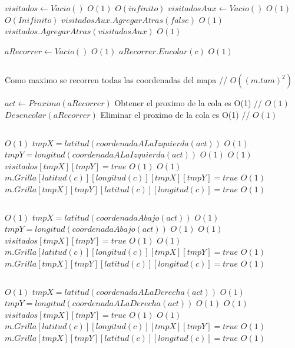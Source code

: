 \begin{Algoritmos}
\begin{algorithmic}[1]
\State $visitados \gets Vacio() $ \Comment $O(1)$
	    \Comment $O(infinito)$
\State $visitadosAux \gets Vacio() $ \Comment $O(1)$	
      \Comment $O(Inifinito)$
\State $visitadosAux.AgregarAtras(false)$ \Comment $O(1)$
\EndFor
\State $visitados.AgregarAtras(visitadosAux)$ \Comment $O(1)$
\EndFor


\State $aRecorrer \gets Vacio() $ \Comment $O(1)$
\State $aRecorrer.Encolar(c)$ \Comment $O(1)$

\State $ $

    \Comment Como maximo se recorren todas las coordenadas del mapa // $O((m.tam)^2)$

\State $act \gets Proximo(aRecorrer)$ \Comment Obtener el proximo de la cola es O(1) // $O(1)$
\State $Desencolar(aRecorrer)$ \Comment Eliminar el proximo de la cola es O(1) // $O(1)$

\State $ $


      \Comment $O(1)$
\State $tmpX = latitud(coordenadaALaIzquierda(act))$   \Comment $O(1)$
\State $tmpY = longitud(coordenadaALaIzquierda(act))$  \Comment $O(1)$
    \Comment $O(1)$
\State $visitados[tmpX][tmpY] = true$    \Comment $O(1)$
	 	\Comment $O(1)$
		\State $m.Grilla[latitud(c)][longitud(c)][tmpX][tmpY] = true$ \Comment $O(1)$
		\State $m.Grilla[tmpX][tmpY][latitud(c)][longitud(c)] = true$ \Comment $O(1)$
	\EndIf
\EndIf
\EndIf

\State $ $

      \Comment $O(1)$
\State $tmpX = latitud(coordenadaAbajo(act))$   \Comment $O(1)$
\State $tmpY = longitud(coordenadaAbajo(act))$  \Comment $O(1)$
    \Comment $O(1)$
\State $visitados[tmpX][tmpY] = true$    \Comment $O(1)$
	 	\Comment $O(1)$
		\State $m.Grilla[latitud(c)][longitud(c)][tmpX][tmpY] = true$ \Comment $O(1)$
		\State $m.Grilla[tmpX][tmpY][latitud(c)][longitud(c)] = true$ \Comment $O(1)$
	\EndIf
\EndIf
\EndIf

\State $ $


      \Comment $O(1)$
\State $tmpX = latitud(coordenadaALaDerecha(act))$   \Comment $O(1)$
\State $tmpY = longitud(coordenadaALaDerecha(act))$  \Comment $O(1)$
    \Comment $O(1)$
\State $visitados[tmpX][tmpY] = true$    \Comment $O(1)$
	 	\Comment $O(1)$
		\State $m.Grilla[latitud(c)][longitud(c)][tmpX][tmpY] = true$ \Comment $O(1)$
		\State $m.Grilla[tmpX][tmpY][latitud(c)][longitud(c)] = true$ \Comment $O(1)$
	\EndIf
\EndIf
\EndIf


\end{algorithmic}
\end{Algoritmos}
